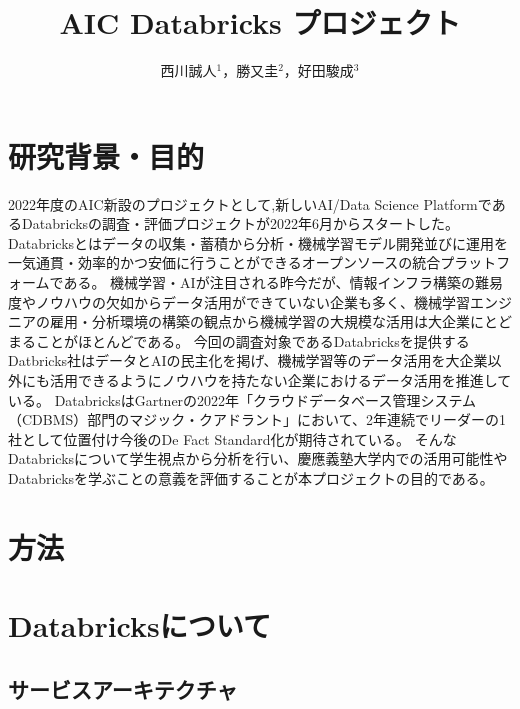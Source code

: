 \documentclass[twocolumn]{jsarticle}
\title{AIC Databricks プロジェクト}
\author{西川誠人$^1$，勝又圭$^2$，好田駿成$^3$}
\begin{document}
\maketitle
\section{研究背景・目的}
2022年度のAIC新設のプロジェクトとして,新しいAI/Data Science PlatformであるDatabricksの調査・評価プロジェクトが2022年6月からスタートした。
Databricksとはデータの収集・蓄積から分析・機械学習モデル開発並びに運用を一気通貫・効率的かつ安価に行うことができるオープンソースの統合プラットフォーム\cite{databricksHP}である。
機械学習・AIが注目される昨今だが、情報インフラ構築の難易度やノウハウの欠如からデータ活用ができていない企業も多く、機械学習エンジニアの雇用・分析環境の構築の観点から機械学習の大規模な活用は大企業にとどまることがほとんどである。
今回の調査対象であるDatabricksを提供するDatbricks社はデータとAIの民主化を掲げ、機械学習等のデータ活用を大企業以外にも活用できるようにノウハウを持たない企業におけるデータ活用を推進している。
DatabricksはGartnerの2022年「クラウドデータベース管理システム（CDBMS）部門のマジック・クアドラント」において、2年連続でリーダーの1社\cite{Gartner}として位置付け今後のDe Fact Standard化が期待されている。
そんなDatabricksについて学生視点から分析を行い、慶應義塾大学内での活用可能性やDatabricksを学ぶことの意義を評価することが本プロジェクトの目的である。
\section{方法}
\section{Databricksについて}
\subsection{サービスアーキテクチャ}
\end{document}
